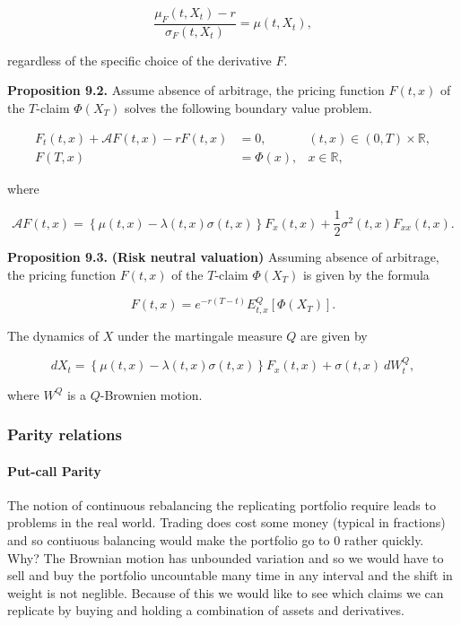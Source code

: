 \documentclass[
]{article}
\begin{document}
\[
\frac{\mu_F(t,X_t)-r}{\sigma_F(t,X_t)}=\mu(t,X_t),
\]

regardless of the specific choice of the derivative \(F\).

\textbf{Proposition 9.2.} Assume absence of arbitrage, the pricing
function \(F(t,x)\) of the \(T\)-claim \(\Phi(X_T)\) solves the
following boundary value problem.

\begin{align*}
F_t(t,x)+\mathcal{A}F(t,x)-rF(t,x)&=0,\hspace{15pt}&(t,x)\in (0,T)\times \mathbb{R},\\
F(T,x)&=\Phi(x), &x\in\mathbb{R},
\end{align*}

where

\[
\mathcal{A}F(t,x)=\left\{\mu(t,x)-\lambda(t,x)\sigma(t,x)\right\}F_x(t,x)+\frac{1}{2}\sigma^2(t,x)F_{xx}(t,x).
\]

\textbf{Proposition 9.3.} \textbf{(Risk neutral valuation)} Assuming
absence of arbitrage, the pricing function \(F(t,x)\) of the \(T\)-claim
\(\Phi(X_T)\) is given by the formula

\[
F(t,x)=e^{-r(T-t)}E^Q_{t,x}[\Phi(X_T)].
\]

The dynamics of \(X\) under the martingale measure \(Q\) are given by

\[
dX_t=\left\{\mu(t,x)-\lambda(t,x)\sigma(t,x)\right\}F_x(t,x)+\sigma(t,x)\ dW^Q_t,
\]

where \(W^Q\) is a \(Q\)-Brownien motion.

\hypertarget{parity-relations}{%
\subsubsection{Parity relations}\label{parity-relations}}

\hypertarget{put-call-parity}{%
\paragraph{Put-call Parity}\label{put-call-parity}}

The notion of continuous rebalancing the replicating portfolio require
leads to problems in the real world. Trading does cost some money
(typical in fractions) and so contiuous balancing would make the
portfolio go to 0 rather quickly. Why? The Brownian motion has unbounded
variation and so we would have to sell and buy the portfolio uncountable
many time in any interval and the shift in weight is not neglible.
Because of this we would like to see which claims we can replicate by
buying and holding a combination of assets and derivatives.
\end{document}
